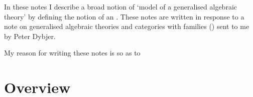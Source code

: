 \documentclass[10pt,a4paper]{article}
\theoremstyle{remark}
\begin{document}
\newcommand{\gatinterpretationaxcond}[5]{
\refstepcounter{equation}(\theequation)\label{#1}& \gatrule{#2}{#3}&$\scriptstyle iff$&&\cellcolor{lightergrey}$#4$&#5}

\newcommand{\gatinterpretationaxcondrhscontinuation}[2]{ &&&& \cellcolor{lightergrey}\hspace{0.5cm} $#1$ &{#2}}

\newcommand{\gatinterpretationaxeqv}[2]{&&$\scriptstyle iff$&&$#1$&#2}


\newcommand{\bigtuple}[1]{\big \langle #1 \big \rangle}


\newcommand{\highlightpara}[1]{\colorbox{highlight}{%
    \parbox{\dimexpr\linewidth-2\fboxsep}%
        {#1}}
}

\newcommand{\genericcrossxproductdiagram}{
$
\begin{array}{ccccc}
\Rnode{xy}{\crossx{x}{y}{w}} &&               &&               \\[1.3cm]
\Rnode{x}{x}                 &&               && \Rnode{y}{y}  \\[1.3cm]
                             && \Rnode{w}{w}  &&                                                   
\end{array}
$
\makebox[0.2cm]{%
\nccdar{xy}{x}
\blabel{p_{\crossx{x}{y}{w},x}}
\nccdar{x}{w}
\blabel{p_{x,w}}
\nccdar{y}{w}
\alabel{p_{y,w}} 
\ncaarr{q(p_{x,w},y)}{xy}{y}
}
}
		
In these notes I describe a broad notion of `model of a generalised algebraic theory' by defining the notion of 
an . 
These notes are written in response to a note on generalised algebraic theories and categories with families
 (\cite{BCDEpaper}) sent to me by Peter Dybjer. 

My reason for writing these notes is so as to 
 
\section{Overview}
\end{document}
